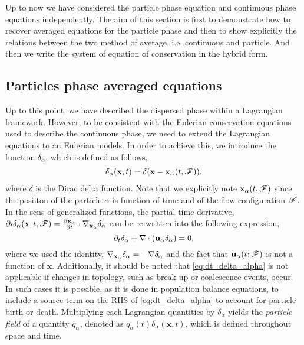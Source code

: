 Up to now we have considered the particle phase equation and continuous phase equations independently. 
The aim of this section is first to demonstrate how to recover averaged equations for the particle phase and then to show explicitly the relations between the two method of average, i.e. continuous and particle.
And then we write the system of equation of conservation in the hybrid form. 

\subsection{Particles phase averaged equations}

Up to this point, we have described the dispersed phase within a Lagrangian framework.
However, to be consistent with the Eulerian conservation equations used to describe the continuous phase, we need to extend the Lagrangian equations to an Eulerian models. 
In order to achieve this, we introduce the function $\delta_\alpha$, which is defined as follows, 
\begin{align}
    \delta_\alpha(\textbf{x},t) = \delta(\textbf{x}-\textbf{x}_\alpha(t,\mathscr{F})).
    \label{eq:delta_alpha}
\end{align}
where $\delta$ is the Dirac delta function.
Note that we explicitly note $\textbf{x}_\alpha(t,\mathscr{F})$ since the posiiton of the particle $\alpha$ is function of time and of the flow configuration $\mathscr{F}$.
In the sens of generalized functions, the partial time derivative, $\partial_t \delta_\alpha(\textbf{x},t,\mathscr{F}) =  \frac{\partial \textbf{x}_\alpha}{\partial t} \cdot \mathbf{\nabla}_{\textbf{x}_\alpha} \delta_\alpha$ can be re-written into the following expression, 
\begin{equation}
    \partial_t \delta_\alpha
    + \mathbf{\nabla}\cdot (\textbf{u}_\alpha  \delta_\alpha)
    =0,
    \label{eq:dt_delta_alpha}
\end{equation}
where we used the identity, $\mathbf{\nabla}_{\textbf{x}_\alpha} \delta_\alpha = -\mathbf{\nabla} \delta_\alpha$ and the fact that $\textbf{u}_\alpha(t;\mathscr{F})$ is not a function of $\textbf{x}$. 
Additionally, it should be noted that \ref{eq:dt_delta_alpha} is not applicable if changes in topology, such as break up or coalescence events, occur.
In such cases it is possible, as it is done in population balance equations, to include a source term on the RHS of \ref{eq:dt_delta_alpha} to account for particle birth or death. 
Multiplying each Lagrangian quantities by $\delta_\alpha$ yields the \textit{particle field} of a quantity $q_\alpha$, denoted as $q_\alpha(t)\delta_\alpha(\textbf{x},t)$, which is defined throughout space and time.
